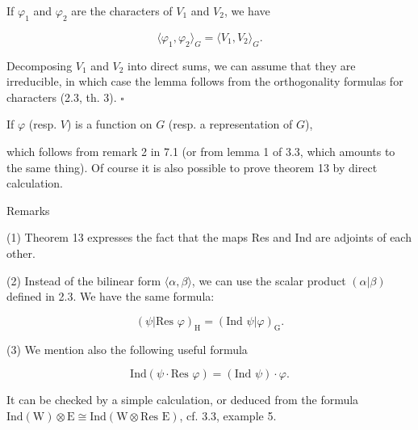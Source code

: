 If $\varphi_1$ and $\varphi_2$ are the characters of $V_1$ and $V_2$, we have

$$\langle \varphi_1, \varphi_2 \rangle_G = \langle V_1, V_2 \rangle_G.$$

Decomposing $V_1$ and $V_2$ into direct sums, we can assume that they are irreducible, in which case the lemma follows from the orthogonality formulas for characters (2.3, th. 3). $\square$

If $\varphi$ (resp. $V$) is a function on $G$ (resp. a representation of $G$),

which follows from remark 2 in 7.1 (or from lemma 1 of 3.3, which amounts to the same thing). Of course it is also possible to prove theorem 13 by direct calculation.

Remarks

(1) Theorem 13 expresses the fact that the maps Res and Ind are adjoints of each other.

(2) Instead of the bilinear form $\langle \alpha, \beta \rangle$, we can use the scalar product $(\alpha | \beta)$ defined in 2.3. We have the same formula:

$$(\psi | \text{Res } \varphi)_{\text{H}} = (\text{Ind } \psi | \varphi)_{\text{G}}.$$

(3) We mention also the following useful formula

$$\text{Ind}(\psi \cdot \text{Res } \varphi) = (\text{Ind } \psi) \cdot \varphi.$$

It can be checked by a simple calculation, or deduced from the formula $\text{Ind}(\text{W}) \otimes \text{E} \cong \text{Ind}(\text{W} \otimes \text{Res E})$, cf. 3.3, example 5.
